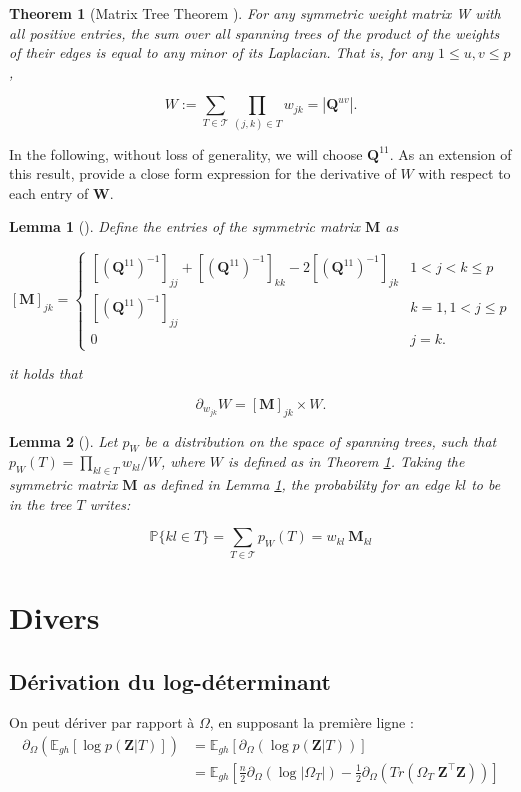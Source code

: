 \documentclass[11pt,a4paper]{article}
\newtheorem{theorem}{Theorem}
\newtheorem{lemma}{Lemma}
\newcommand{\Zbf}{\boldsymbol{Z}}
\newcommand{\Wbf}{\boldsymbol{W}}
\newcommand{\Qbf}{\boldsymbol{Q}}
\newcommand{\Mbf}{\boldsymbol{M}}
\newcommand{\Esp}{\mathds{E}}
\begin{document}
\begin{theorem}[Matrix Tree Theorem  \cite{matrixtree,Meila}] \label{thm:MTT}
    For any symmetric weight matrix W with all positive entries, the sum over all spanning trees of the product of the weights of their edges is equal to any minor of its Laplacian. That is, for any $1 \leq u, v \leq p$,
 
   \[
    W := \sum_{T\in\mathcal{T}} \prod_{(j, k)\in T} w_{jk} = |\Qbf^{uv}|.
    \]
   
\end{theorem}    

In the following, without loss of generality, we will choose $\Qbf^{11}$. As an extension of this result, \cite{Meila} provide a close form expression for the derivative of $W$ with respect to each entry of $\Wbf$. 

\begin{lemma} [\cite{Meila}] \label{lem:Meila}
    Define the entries of the symmetric matrix $\Mbf$ as
 
\[    
 [\Mbf]_{jk} =\begin{cases}
    \left[(\Qbf^{11})^{-1}\right]_{jj} + \left[(\Qbf^{11})^{-1}\right]_{kk} -2\left[(\Qbf^{11})^{-1}\right]_{jk} & 1< j<k \leq p\\
    \left[(\Qbf^{11})^{-1}\right]_{jj} & k=1, 1< j \leq p  \\
    0 &  j=k .
    \end{cases}
\]
 
it holds that
 
$$
\partial_{w_{jk}} W = [\Mbf]_{jk}  \times W.
$$
\end{lemma}
\begin{lemma} [\cite{kirshner}] \label{lem:Kirshner}
    Let $p_W$ be a distribution on the space of spanning trees, such that $p_W(T)=\prod_{kl\in T} w_{kl} / W$, where $W$ is defined as in Theorem \ref{thm:MTT}. Taking the symmetric matrix $\Mbf$ as defined in Lemma  \ref{lem:Meila}, the probability for an edge $kl$ to be in the tree $T$ writes:
 
$$\mathds{P}\{kl\in T\} = \sum_{T\in \mathcal{T}} p_W(T)= w_{kl}\: \Mbf_{kl}$$
\end{lemma}
 \section{Divers}
 
\subsection{Dérivation du log-déterminant}
On peut dériver par rapport à $\Omega$, en supposant la première ligne :
\begin{align}
    \partial_{\Omega}\left(\Esp_{gh}\left[\log p(\Zbf | T)\right] \right)&=  \Esp_{gh}\left[\partial_{\Omega}( \log p(\Zbf | T) )\right] \\
    &=\Esp_{gh}\left[\frac{n}{2}\partial_{\Omega}( \log |\Omega_T|) -\frac{1}{2} \partial_\Omega (Tr(\Omega_T \; \Zbf^\intercal \Zbf ))\right]
\end{align}
\end{document}
